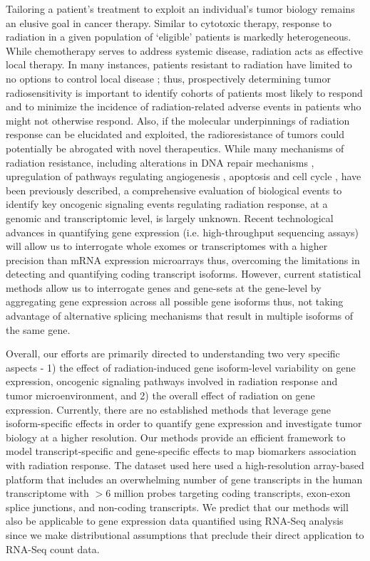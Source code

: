 \documentclass[hidelinks,11pt]{article}
\begin{document}
Tailoring a patient's treatment to exploit an individual's tumor biology remains an elusive goal in cancer therapy.  Similar to cytotoxic therapy, response to radiation in a given population of `eligible' patients is markedly heterogeneous. While chemotherapy serves to address systemic disease, radiation acts as effective local therapy.  In many instances, patients resistant to radiation have limited to no options to control local disease \cite{roca,roca_eschrich,baumann_krause}; thus, prospectively determining tumor radiosensitivity is important to identify cohorts of patients most likely to respond and to minimize the incidence of radiation-related adverse events in patients who might not otherwise respond. Also, if the molecular underpinnings of radiation response can be elucidated and exploited, the radioresistance of tumors could potentially be abrogated with novel therapeutics. While many mechanisms of radiation resistance, including alterations in DNA repair mechanisms \cite{dna_repair}, upregulation of pathways regulating angiogenesis \cite{angio}, apoptosis \cite{apoptosis} and cell cycle \cite{cell_cycle}, have been previously described, a comprehensive evaluation of biological events to identify key oncogenic signaling events regulating radiation response, at a genomic and transcriptomic level, is largely unknown. Recent technological advances in quantifying gene expression (i.e. high-throughput sequencing assays) will allow us to interrogate whole exomes or transcriptomes with a higher precision than mRNA expression microarrays thus, overcoming the limitations in detecting and quantifying coding transcript isoforms. However, current statistical methods allow us to interrogate genes and gene-sets at the gene-level by aggregating gene expression across all possible gene isoforms thus, not taking advantage of alternative splicing mechanisms that result in multiple isoforms of the same gene. 

Overall, our efforts are primarily directed to understanding two very specific aspects - 1) the effect of radiation-induced gene isoform-level variability on gene expression, oncogenic signaling pathways involved in radiation response and tumor microenvironment, and 2) the overall effect of radiation on gene expression. Currently, there are no established methods that leverage gene isoform-specific effects in order to quantify gene expression and investigate tumor biology at a higher resolution. Our methods provide an efficient framework to model transcript-specific and gene-specific effects to map biomarkers association with radiation response. The dataset used here used a high-resolution array-based platform that includes an overwhelming number of gene transcripts in the human transcriptome with $>$6 million probes targeting coding transcripts, exon-exon splice junctions, and non-coding transcripts. 
We predict that our methods will also be applicable to gene expression data quantified using RNA-Seq analysis since we make distributional assumptions that preclude their direct application to RNA-Seq count data. 
\end{document}
